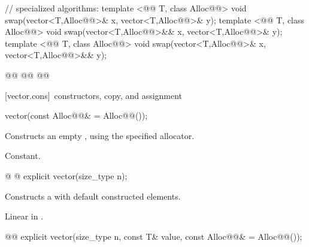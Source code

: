 \documentclass[american,twoside]{book}
\begin{document}
\begin{codeblock}
{  // specialized algorithms:
  template <@@ T, class Alloc@@>
    void swap(vector<T,Alloc@@>& x, vector<T,Alloc@@>& y);
  template <@@ T, class Alloc@@>
    void swap(vector<T,Alloc@@>&& x, vector<T,Alloc@@>& y);
  template <@@ T, class Alloc@@>
    void swap(vector<T,Alloc@@>& x, vector<T,Alloc@@>&& y);

  @@
    @@
      @@
}
\end{codeblock}%
%

[vector.cons]{\ constructors, copy, and assignment}

\begin{itemdecl}
vector(const Alloc@@& = Alloc@@());
\end{itemdecl}

\begin{itemdescr}
\pnum
\effects Constructs an empty , using the
specified allocator.

\pnum
\complexity Constant.
\end{itemdescr}

\begin{itemdecl}
@ @ explicit vector(size_type n);
\end{itemdecl}

\begin{itemdescr}
\pnum
\effects Constructs a  with 
default constructed elements.

\pnum
{}

\pnum
\complexity Linear in .
\end{itemdescr}

\begin{itemdecl}
@@
explicit vector(size_type n, const T& value,
                const Alloc@@& = Alloc@@());
\end{itemdecl}
\end{document}
